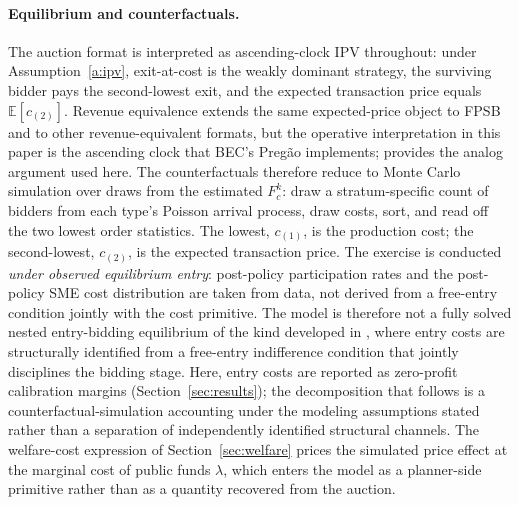 \paragraph{Equilibrium and counterfactuals.} The auction format is interpreted as ascending-clock IPV throughout: under Assumption~\ref{a:ipv}, exit-at-cost is the weakly dominant strategy, the surviving bidder pays the second-lowest exit, and the expected transaction price equals $\mathbb{E}[c_{(2)}]$. Revenue equivalence \citep{vickrey1961, maskinriley2000} extends the same expected-price object to FPSB and to other revenue-equivalent formats, but the operative interpretation in this paper is the ascending clock that BEC's Preg\~ao implements; \citet{krasnokutskaya2011} provides the analog argument used here. The counterfactuals therefore reduce to Monte Carlo simulation over draws from the estimated $F_c^k$: draw a stratum-specific count of bidders from each type's Poisson arrival process, draw costs, sort, and read off the two lowest order statistics. The lowest, $c_{(1)}$, is the production cost; the second-lowest, $c_{(2)}$, is the expected transaction price. The exercise is conducted \emph{under observed equilibrium entry}: post-policy participation rates and the post-policy SME cost distribution are taken from data, not derived from a free-entry condition jointly with the cost primitive. The model is therefore not a fully solved nested entry-bidding equilibrium of the kind developed in \citet{krasnokutskayaseim2011}, where entry costs are structurally identified from a free-entry indifference condition that jointly disciplines the bidding stage. Here, entry costs are reported as zero-profit calibration margins (Section~\ref{sec:results}); the decomposition that follows is a counterfactual-simulation accounting under the modeling assumptions stated rather than a separation of independently identified structural channels. The welfare-cost expression of Section~\ref{sec:welfare} prices the simulated price effect at the marginal cost of public funds $\lambda$, which enters the model as a planner-side primitive rather than as a quantity recovered from the auction.


